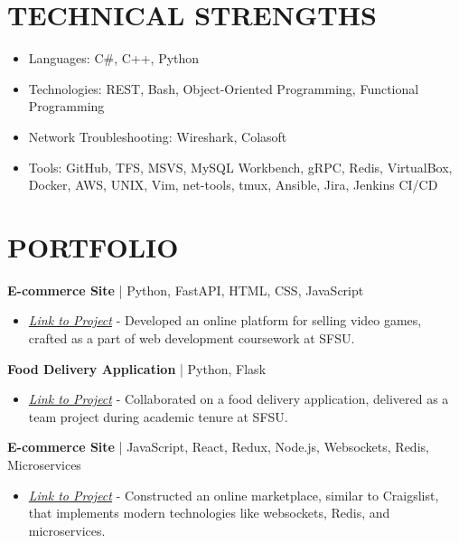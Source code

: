 \documentclass[a4paper,10pt]{article}
\begin{document}
\section*{TECHNICAL STRENGTHS}
\begin{itemize}
\item Languages: C\#, C++, Python
\item Technologies: REST, Bash, Object-Oriented Programming, Functional Programming
\item Network Troubleshooting: Wireshark, Colasoft
\item Tools: GitHub, TFS, MSVS, MySQL Workbench, gRPC, Redis, VirtualBox, Docker, AWS, UNIX, Vim, net-tools, tmux, Ansible, Jira, Jenkins CI/CD
\end{itemize}

\section*{PORTFOLIO}
\noindent
\textbf{E-commerce Site} | Python, FastAPI, HTML, CSS, JavaScript\\
\begin{itemize}
\item \textit{\href{https://github.com/RobertAldenFreeman/exceptional-site}{Link to Project}} - Developed an online platform for selling video games, crafted as a part of web development coursework at SFSU.
\end{itemize}
\noindent
\textbf{Food Delivery Application} | Python, Flask\\
\begin{itemize}
\item \textit{\href{https://github.com/RobertAldenFreeman/food-delivery-application}{Link to Project}} - Collaborated on a food delivery application, delivered as a team project during academic tenure at SFSU.
\end{itemize}
\noindent
\textbf{E-commerce Site} | JavaScript, React, Redux, Node.js, Websockets, Redis, Microservices\\
\begin{itemize}
\item \textit{\href{https://github.com/RobertAldenFreeman/e-commerce-site}{Link to Project}} - Constructed an online marketplace, similar to Craigslist, that implements modern technologies like websockets, Redis, and microservices.
\end{itemize}
\end{document}
